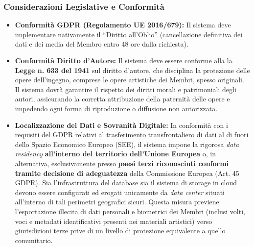 \subsubsection{Considerazioni Legislative e Conformità}
\begin{itemize}
    \item \textbf{Conformità GDPR (Regolamento UE 2016/679):} Il sistema deve implementare nativamente il ``Diritto all'Oblio'' (cancellazione definitiva dei dati e dei media del Membro entro 48 ore dalla richiesta). 
    \item \textbf{Conformità Diritto d'Autore:} Il sistema deve essere conforme alla la \textbf{Legge n. 633 del 1941} sul diritto d'autore, che disciplina la protezione delle opere dell'ingegno, comprese le opere artistiche dei Membri, spesso originali. Il sistema dovr\`a garantire il rispetto dei diritti morali e patrimoniali degli autori, assicurando la corretta attribuzione della paternit\`a delle opere e impedendo ogni forma di riproduzione o diffusione non autorizzata.
    \item \textbf{Localizzazione dei Dati e Sovranità Digitale:} In conformità con i requisiti del GDPR relativi al trasferimento transfrontaliero di dati al di fuori dello Spazio Economico Europeo (SEE), il sistema impone la rigorosa \textit{data residency} \textbf{all'interno del territorio dell'Unione Europea} o, in alternativa, esclusivamente presso \textbf{paesi terzi riconosciuti conformi tramite decisione di adeguatezza} della Commissione Europea (Art. 45 GDPR). Sia l'infrastruttura del database sia il sistema di storage in cloud devono essere configurati ed erogati unicamente da \textit{data center} situati all'interno di tali perimetri geografici sicuri. Questa misura previene l'esportazione illecita di dati personali e biometrici dei Membri (inclusi volti, voci e metadati identificativi presenti nei materiali artistici) verso giurisdizioni terze prive di un livello di protezione equivalente a quello comunitario.
\end{itemize}
